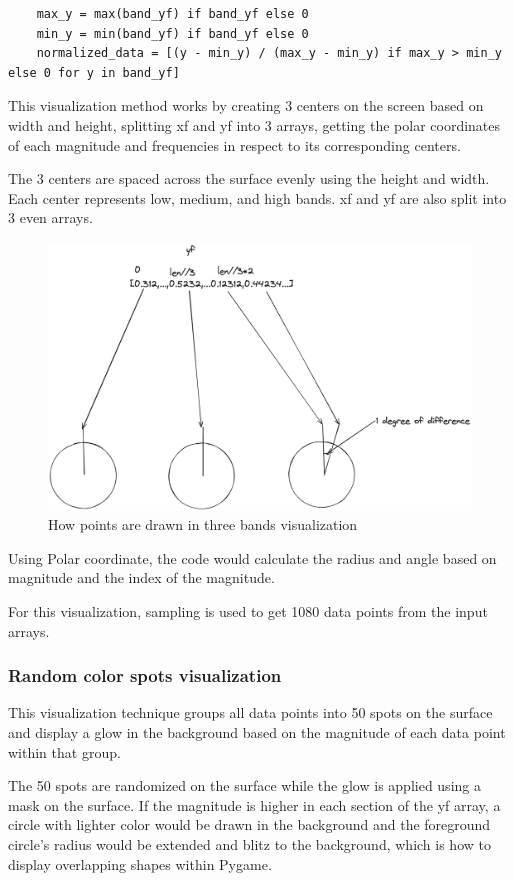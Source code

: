 \documentclass{article}
\begin{document}
\begin{lstlisting}
    max_y = max(band_yf) if band_yf else 0
    min_y = min(band_yf) if band_yf else 0
    normalized_data = [(y - min_y) / (max_y - min_y) if max_y > min_y else 0 for y in band_yf]
\end{lstlisting}

This visualization method works by creating 3 centers on the screen based on width and height, splitting xf and yf into 3 arrays, getting the polar coordinates of each magnitude and frequencies in respect to its corresponding centers.

The 3 centers are spaced across the surface evenly using the height and width. Each center represents low, medium, and high bands. xf and yf are also split into 3 even arrays.

\space

\begin{figure}
    \centering
    \includegraphics[width=0.5\linewidth]{3circles.png}
    \caption{How points are drawn in three bands visualization}
    \label{fig:circle}
\end{figure}

Using Polar coordinate, the code would calculate the radius and angle based on magnitude and the index of the magnitude. 

For this visualization, sampling is used to get 1080 data points from the input arrays.

\subsubsection{Random color spots visualization}

This visualization technique groups all data points into 50 spots on the surface and display a glow in the background based on the magnitude of each data point within that group.

The 50 spots are randomized on the surface while the glow is applied using a mask on the surface. If the magnitude is higher in each section of the yf array, a circle with lighter color would be drawn in the background and the foreground circle's radius would be extended and blitz to the background, which is how to display overlapping shapes within Pygame. \cite{kinsley}
\end{document}
